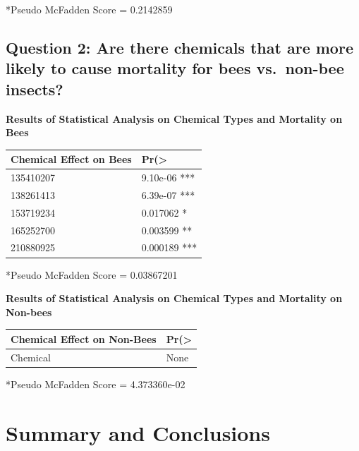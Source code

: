\documentclass[
  12pt,
]{article}
\begin{document}
*Pseudo McFadden Score = 0.2142859

\hypertarget{question-2-are-there-chemicals-that-are-more-likely-to-cause-mortality-for-bees-vs.-non-bee-insects}{%
\subsection{Question 2: Are there chemicals that are more likely to
cause mortality for bees vs.~non-bee
insects?}\label{question-2-are-there-chemicals-that-are-more-likely-to-cause-mortality-for-bees-vs.-non-bee-insects}}

\textbf{Results of Statistical Analysis on Chemical Types and Mortality
on Bees}

\begin{longtable}[]{@{}ll@{}}
\toprule
Chemical Effect on Bees & Pr(\textgreater{} \\
\midrule
\endhead
135410207 & 9.10e-06 *** \\
138261413 & 6.39e-07 *** \\
153719234 & 0.017062 * \\
165252700 & 0.003599 ** \\
210880925 & 0.000189 *** \\
\bottomrule
\end{longtable}

*Pseudo McFadden Score = 0.03867201

\textbf{Results of Statistical Analysis on Chemical Types and Mortality
on Non-bees}

\begin{longtable}[]{@{}ll@{}}
\toprule
Chemical Effect on Non-Bees & Pr(\textgreater{} \\
\midrule
\endhead
Chemical & None \\
\bottomrule
\end{longtable}

*Pseudo McFadden Score = 4.373360e-02

\newpage

\hypertarget{summary-and-conclusions}{%
\section{Summary and Conclusions}\label{summary-and-conclusions}}
\end{document}
